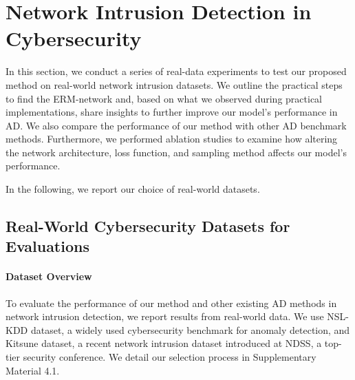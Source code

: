 \documentclass{article}
\begin{document}
\section{Network Intrusion Detection in Cybersecurity}
\label{section:experiments}

In this section, we conduct a series of real-data experiments to test our proposed method on real-world network intrusion datasets.
We outline the practical steps to find the ERM-network and, based on what we observed during practical implementations, share insights to further improve our model's performance in AD.
We also compare the performance of our method with other AD benchmark methods. 
Furthermore, we performed ablation studies to examine how altering the network architecture, loss function, and sampling method affects our model's performance. 
% 

In the following, we report our choice of real-world datasets. 



\subsection{Real-World Cybersecurity Datasets for Evaluations}
\label{section:real_world_datasets}


\paragraph*{Dataset Overview}
To evaluate the performance of our method and other existing AD methods in network intrusion detection, we report results from real-world data.
We use NSL-KDD \citep{NSL_KDD_Dataset} dataset, a widely used cybersecurity benchmark for anomaly detection, and Kitsune \citep{kitsune_dataset} dataset, a recent network intrusion dataset introduced at NDSS, a top-tier security conference.
We detail our selection process in Supplementary Material 4.1.
\end{document}
